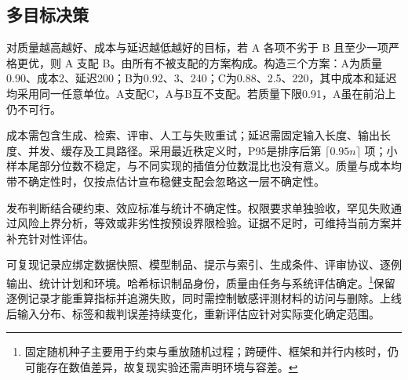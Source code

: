 \documentclass[../textbook.tex]{subfiles}
\begin{document}
\subsection{多目标决策}
对质量越高越好、成本与延迟越低越好的目标，若 A 各项不劣于 B 且至少一项严格更优，则 A 支配 B。由所有不被支配的方案构成。构造三个方案：A为质量0.90、成本2、延迟200；B为0.92、3、240；C为0.88、2.5、220，其中成本和延迟均采用同一任意单位。A支配C，A与B互不支配。若质量下限0.91，A虽在前沿上仍不可行。

成本需包含生成、检索、评审、人工与失败重试；延迟需固定输入长度、输出长度、并发、缓存及工具路径。采用最近秩定义时，P95是排序后第 $\lceil0.95n\rceil$ 项；小样本尾部分位数不稳定，与不同实现的插值分位数混比也没有意义。质量与成本均带不确定性时，仅按点估计宣布稳健支配会忽略这一层不确定性。

\begin{note}
发布判断结合硬约束、效应标准与统计不确定性。权限要求单独验收，罕见失败通过风险上界分析，等效或非劣性按预设界限检验。证据不足时，可维持当前方案并补充针对性评估。
\end{note}

可复现记录应绑定数据快照、模型制品、提示与索引、生成条件、评审协议、逐例输出、统计计划和环境。哈希标识制品身份，质量由任务与系统评估确定。\footnote{固定随机种子主要用于约束与重放随机过程；跨硬件、框架和并行内核时，仍可能存在数值差异，故复现实验还需声明环境与容差。}保留逐例记录才能重算指标并追溯失败，同时需控制敏感评测材料的访问与删除。上线后输入分布、标签和裁判误差持续变化，重新评估应针对实际变化确定范围。



\chapterreferences
\myendchapterdocument
\end{document}

